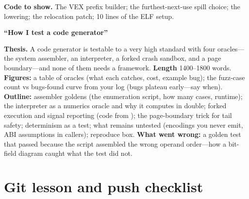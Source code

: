 \begin{blogbox}
\textbf{Code to show.} The VEX prefix builder; the furthest-next-use spill choice; the  lowering; the relocation patch; 10 lines of the ELF  setup.

 \textbf{``How I test a code generator''}

\textbf{Thesis.} A code generator is testable to a very high standard with four oracles---the system assembler, an interpreter, a forked crash sandbox, and a page boundary---and none of them needs a framework. \textbf{Length} 1400--1800 words. \textbf{Figures:} a table of oracles (what each catches, cost, example bug); the fuzz-case count vs bugs-found curve from your log (bugs plateau early---say when). \textbf{Outline:} assembler goldens (the enumeration script, how many cases, runtime); the interpreter as a numerics oracle and why it computes in double; forked execution and signal reporting (code from ); the page-boundary trick for tail safety; determinism as a test; what remains untested (encodings you never emit, ABI assumptions in callers); reproduce box. \textbf{What went wrong:} a golden test that passed because the script assembled the wrong operand order---how a bit-field diagram caught what the test did not.
\end{blogbox}

\section{Git lesson and push checklist}

